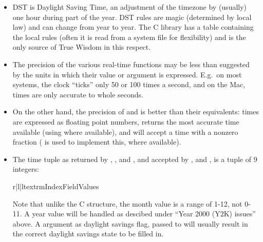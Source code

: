 \begin{itemize}
\item
DST is Daylight Saving Time, an adjustment
of the timezone by (usually) one hour during part of the year.  DST
rules are magic (determined by local law) and can change from year to
year.  The C library has a table containing the local rules (often it
is read from a system file for flexibility) and is the only source of
True Wisdom in this respect.

\item
The precision of the various real-time functions may be less than
suggested by the units in which their value or argument is expressed.
E.g.\ on most \UNIX{} systems, the clock ``ticks'' only 50 or 100 times a
second, and on the Mac, times are only accurate to whole seconds.

\item
On the other hand, the precision of  and
 is better than their \UNIX{} equivalents: times are
expressed as floating point numbers,  returns the
most accurate time available (using \UNIX{} 
where available), and  will accept a time with a
nonzero fraction (\UNIX{}  is used to implement
this, where available).

\item

The time tuple as returned by ,
, and , and accepted by
,  and ,
is a tuple of 9 integers:

\begin{tableiii}{r|l|l}{textrm}{Index}{Field}{Values}
\end{tableiii}

Note that unlike the C structure, the month value is a
range of 1-12, not 0-11.  A year value will be handled as descibed
under ``Year 2000 (Y2K) issues'' above.  A  argument as
daylight savings flag, passed to  will usually
result in the correct daylight savings state to be filled in.

\end{itemize}


